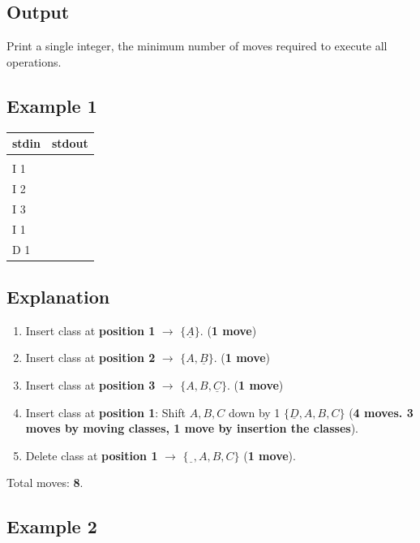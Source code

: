 \documentclass[12pt,a4paper]{article}
\begin{document}
\subsection*{\fontsize{16}{12}Output}
Print a single integer, the minimum number of moves required to execute all operations.
\subsection*{\fontsize{16}{12}Example 1}

\begin{table}[h]
  \centering
  \begin{tabularx}{\textwidth}{|>{\ttfamily}X|>{\ttfamily}X|}
  \hline
  \textbf{stdin} & \textbf{stdout} \\
  \hline
  5 & 8 \\
  I 1 &  \\
  I 2 & \\
  I 3 & \\
  I 1 &\\
  D 1 & \\
  \hline
 \end{tabularx}
\end{table}
\newpage
\subsection*{\fontsize{16}{12}Explanation}
\begin{enumerate}
    \item Insert class at \textbf{position 1} $\rightarrow$ \(\{\underline{A}\}\). (\textbf{1 move})
    \item Insert class at \textbf{position 2} $\rightarrow$ \(\{A, \underline{B}\}\). (\textbf{1 move})
    \item Insert class at \textbf{position 3}  $\rightarrow$ \(\{A, B, \underline{C}\}\). (\textbf{1 move})
    \item Insert class at \textbf{position 1}: Shift \( A, B, C \) down by 1 \(\{\underline{D}, A, B, C\}\) (\textbf{4 moves. 3 moves by moving classes, 1 move by insertion the classes}).
    \item Delete class at \textbf{position 1} $\rightarrow$ \(\{\underline{\ \ }, A, B, C\}\) (\textbf{1 move}).
\end{enumerate}
Total moves: \textbf{8}.

\subsection*{\fontsize{16}{12}Example 2}
\end{document}
